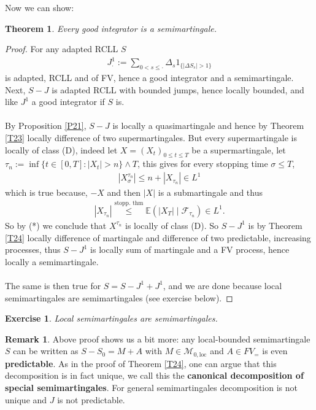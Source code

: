 \documentclass[12pt,a4paper, twoside]{article}
\newtheorem{thm}{Theorem}[section]
\newtheorem{exe}{Exercise}[section]
\theoremstyle{definition}
\newtheorem{rem}{Remark}[section]
\newcommand{\EE}{\mathbb{E}} %
\begin{document}
\newpage
Now we can show:
\begin{thm}\label{T25} Every good integrator is a semimartingale.
\end{thm}
\begin{proof}
For any adapted RCLL $S$ 
\begin{align*}
J_\cdot^1 := \sum_{0 < s \leq \cdot } \Delta_s 1_{\{ | \Delta S_s| > 1 \}}
\end{align*}
is adapted, RCLL and of FV, hence a good integrator and a semimartingale. Next, $S-J$ is adapted RCLL with bounded jumps, hence locally bounded, and like $J^1$ a good integrator if $S$ is. \\
\\
By Proposition \ref{P21}, $S-J$ is locally a quasimartingale and hence by Theorem \ref{T23} locally difference of two supermartingales. But every supermartingale is locally of class (D), indeed let $X=(X_t)_{0 \leq t \leq T}$ be a supermartingale, let $\tau_n := \inf \{ t \in [0,T]: |X_t| > n \} \wedge T$, this gives for every stopping time $\sigma \leq T$, 
\begin{align*}
|X_\sigma^{\tau_n}| \leq n + |X_{\tau_n}| \in L^1 \tag{*}
\end{align*}
which is true because, $-X$ and then $|X|$ is a submartingale and thus 
\begin{align*}
|X_{\tau_n}| \overset{\text{stopp. thm}}\leq \EE( |X_T| \mid \mathcal{F}_{\tau_n}) \in  L^1.
\end{align*}
So by (*) we conclude that $X^{\tau_n}$ is locally of class (D). So $S-J^1$ is by Theorem \ref{T24} locally difference of martingale and difference of two predictable,  increasing processes, thus $S-J^1$ is locally sum of martingale and a FV process, hence locally a semimartingale. 
\\\\
The same is then true for $S=S-J^1 + J^1$, and we are done because local semimartingales are semimartingales (see exercise below).
\end{proof}
\begin{exe}Local semimartingales are semimartingales.
\end{exe}
\begin{rem}Above proof shows us a bit more: any local-bounded semimartingale $S$ can be written as $S-S_0 = M +A$ with $M \in \mathcal{M}_{0, \text{loc}}$ and $A \in FV_=$ is even \textbf{predictable}. As in the proof of Theorem \ref{T24}, one can argue that this decomposition is in fact unique, we call this the \textbf{canonical decomposition of special semimartingales}. For general semimartingales decomposition is not unique and $J$ is not predictable. 
\end{rem}
\end{document}
